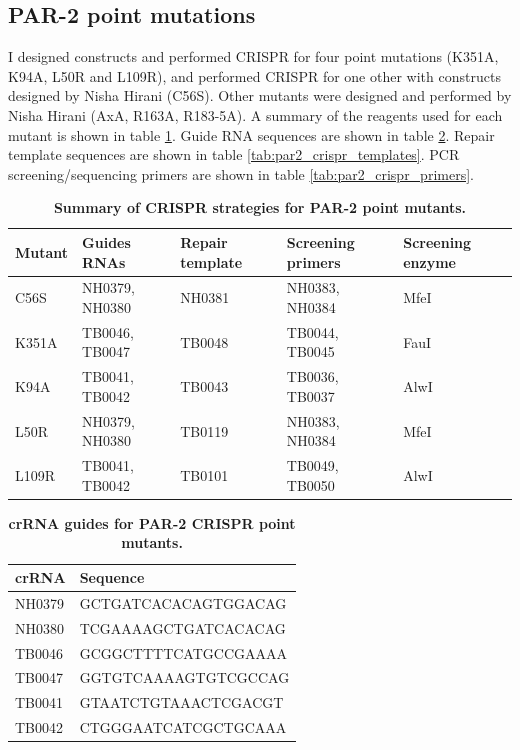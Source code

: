 \documentclass[12pt]{"report"}
\newcommand{\mycaption}[2]{\caption[#1]{\textbf{#1.} #2}}
\begin{document}
\subsection{PAR-2 point mutations}

I designed constructs and performed CRISPR for four point mutations (K351A, K94A, L50R and L109R), and performed CRISPR for one other with constructs designed by Nisha Hirani (C56S). Other mutants were designed and performed by Nisha Hirani (AxA, R163A, R183-5A). A summary of the reagents used for each mutant is shown in table \ref{tab:par2_crispr_summary}. Guide RNA sequences are shown in table \ref{tab:par2_crispr_guides}. Repair template sequences are shown in table \ref{tab:par2_crispr_templates}. PCR screening/sequencing primers are shown in table \ref{tab:par2_crispr_primers}.\\

\begin{table}[]
\footnotesize
\begin{tabularx}{400pt}{|X|X|X|X|X|}
\hline
\textbf{Mutant} & \textbf{Guides RNAs} & \textbf{Repair template} & \textbf{Screening primers} & \textbf{Screening enzyme} \\ \hline
C56S & NH0379, NH0380 & NH0381 & NH0383, NH0384 & MfeI \\ \hline
K351A & TB0046, TB0047 & TB0048 & TB0044, TB0045 & FauI \\ \hline
K94A & TB0041, TB0042 & TB0043 & TB0036, TB0037 & AlwI \\ \hline
L50R & NH0379, NH0380 & TB0119 & NH0383, NH0384 & MfeI \\ \hline
L109R & TB0041, TB0042 & TB0101 & TB0049, TB0050 & AlwI \\ \hline
\end{tabularx}
\mycaption{Summary of CRISPR strategies for PAR-2 point mutants}{}
\label{tab:par2_crispr_summary}
\end{table}

\begin{table}[]
\footnotesize
\begin{tabular}{|l|l|}
\hline
\textbf{crRNA} & \textbf{Sequence} \\ \hline
NH0379 & GCTGATCACACAGTGGACAG \\ \hline
NH0380 & TCGAAAAGCTGATCACACAG \\ \hline
TB0046 & GCGGCTTTTCATGCCGAAAA \\ \hline
TB0047 & GGTGTCAAAAGTGTCGCCAG \\ \hline
TB0041 & GTAATCTGTAAACTCGACGT \\ \hline
TB0042 & CTGGGAATCATCGCTGCAAA \\ \hline
\end{tabular}
\mycaption{crRNA guides for PAR-2 CRISPR point mutants}{}
\label{tab:par2_crispr_guides}
\end{table}
\end{document}
